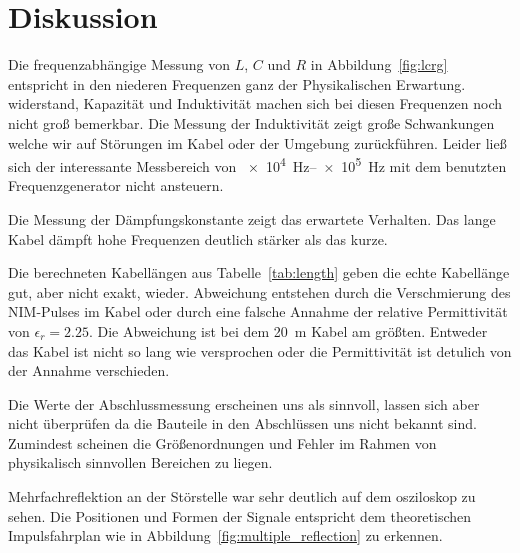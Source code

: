 \section{Diskussion}\label{sec:Diskussion}

Die frequenzabhängige Messung von $L$, $C$ und $R$ in Abbildung~\ref{fig:lcrg} entspricht in den niederen Frequenzen ganz der Physikalischen Erwartung.
widerstand, Kapazität und Induktivität machen sich bei diesen Frequenzen noch nicht groß bemerkbar. Die Messung der Induktivität zeigt große Schwankungen
welche wir auf Störungen im Kabel oder der Umgebung zurückführen. Leider ließ sich der interessante Messbereich von \SIrange{e4}{e5}{\hertz}
mit dem benutzten Frequenzgenerator nicht ansteuern.

Die Messung der Dämpfungskonstante zeigt das erwartete Verhalten. Das lange Kabel dämpft hohe Frequenzen deutlich stärker als das kurze.

Die berechneten Kabellängen aus Tabelle~\ref{tab:length} geben die echte Kabellänge gut, aber nicht exakt, wieder. Abweichung entstehen durch die Verschmierung
des NIM-Pulses im Kabel oder durch eine falsche Annahme der relative Permittivität von $\epsilon_r = 2.25$. Die Abweichung ist bei dem \SI{20}{\meter} Kabel
am größten. Entweder das Kabel ist nicht so lang wie versprochen oder die Permittivität ist detulich von der Annahme verschieden.

Die Werte der Abschlussmessung erscheinen uns als sinnvoll, lassen sich aber nicht überprüfen da die Bauteile in den Abschlüssen uns nicht bekannt sind.
Zumindest scheinen die Größenordnungen und Fehler im Rahmen von physikalisch sinnvollen Bereichen zu liegen.

Mehrfachreflektion an der Störstelle war sehr deutlich auf dem osziloskop zu sehen. Die Positionen und Formen der Signale entspricht dem theoretischen Impulsfahrplan
wie in Abbildung~\ref{fig:multiple_reflection} zu erkennen.

 
